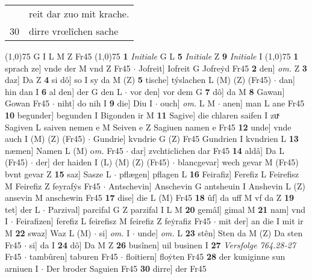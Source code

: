 \documentclass[8pt,a4paper,notitlepage]{article}
\begin{document}
\begin{table}[ht]
\begin{minipage}[t]{0.5\linewidth}
\begin{tabular}{rl}
 & reit dar zuo mit krache.\\ 
30 & dirre vrœlîchen sache\\ 
\end{tabular}
\scriptsize
\line(1,0){75} \newline
G I L M Z Fr45 \newline
\line(1,0){75} \newline
\textbf{1} \textit{Initiale} G L  \textbf{5} \textit{Initiale} Z  \textbf{9} \textit{Initiale} I  \newline
\line(1,0){75} \newline
\textbf{1} sprach ze] vnde der M vnd Z Fr45  $\cdot$ Jofreit] Iofreit G Jofreẏd Fr45 \textbf{2} den] \textit{om.} Z \textbf{3} daz] Da Z \textbf{4} si dô] so I sy da M (Z) \textbf{5} tische] týslachen L (M) (Z) (Fr45)  $\cdot$ dan] hin dan I \textbf{6} al den] der G den L  $\cdot$ vor den] vor dem G \textbf{7} dô] da M \textbf{8} Gawan] Gowan Fr45  $\cdot$ niht] do nih I \textbf{9} die] Diu I  $\cdot$ ouch] \textit{om.} L M  $\cdot$ anen] man L ane Fr45 \textbf{10} begunder] begunden I Bigonden ir M \textbf{11} Sagive] die chlaren saifen I zuͯ Sagiven L saiven nemen e M Seiven e Z Sagiuen namen e Fr45 \textbf{12} unde] vnde auch I (M) (Z) (Fr45)  $\cdot$ Gundrie] kvndrie G (Z) Fr45 Gundrien I kvndrien L \textbf{13} næmen] Namen L (M) o\textit{m. } Fr45  $\cdot$ dar] zvchticlichen dar Fr45 \textbf{14} aldâ] Da L (Fr45)  $\cdot$ der] der haiden I (L) (M) (Z) (Fr45)  $\cdot$ blancgevar] wech gevar M (Fr45) bvnt gevar Z \textbf{15} saz] Sasze L  $\cdot$ pflægen] pflagen L \textbf{16} Feirafiz] Ferefiz L Feirefisz M Feirefiz Z feyrafẏs Fr45  $\cdot$ Antschevin] Anschevin G antsheuin I Anshevin L (Z) ansevin M anschewin Fr45 \textbf{17} dise] die L (M) Fr45 \textbf{18} ûf] da uff M vf da Z \textbf{19} tet] der L  $\cdot$ Parzival] parcifal G Z parzifal I L M \textbf{20} gemâl] gimal M \textbf{21} nam] vnd I  $\cdot$ Feirafizen] ferefiz L feirefisz M feirefiz Z feẏrafiz Fr45  $\cdot$ mit der] an die I mit ir M \textbf{22} swaz] Waz L (M)  $\cdot$ si] \textit{om.} I  $\cdot$ unde] \textit{om.} L \textbf{23} stên] Sten da M (Z) Da sten Fr45  $\cdot$ si] da I \textbf{24} dô] Da M Z \textbf{26} busînen] uil businen I \textbf{27} \textit{Versfolge 764.28-27} Fr45   $\cdot$ tambûren] taburen Fr45  $\cdot$ floitiern] floẏten Fr45 \textbf{28} der kuniginne sun arniuen I  $\cdot$ Der broder Saguien Fr45 \textbf{30} dirre] der Fr45 \newline
\end{minipage}
\hspace{0.5cm}

\end{table}
\end{document}
